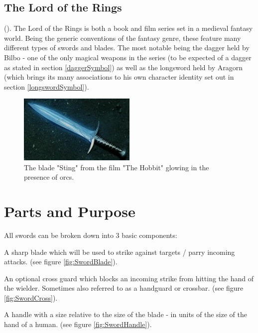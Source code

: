 \documentclass{article}
\begin{document}
\pagebreak

\subsection{The Lord of the Rings}

().
The Lord of the Rings is both a book and film series set in a medieval fantasy world. Being the generic conventions of the fantasy genre, these feature many different types of swords and blades. The most notable being the dagger held by Bilbo - one of the only magical weapons in the series (to be expected of a dagger as stated in section \ref{daggerSymbol}) as well as the longsword held by Aragorn (which brings its many associations to his own character identity set out in section \ref{longswordSymbol}).

\begin{figure}[h]
    \centering
    \caption{\parencite{Sting} The blade "Sting" from the film "The Hobbit" glowing in the presence of orcs.}
    \label{fig:Sting}
    \includegraphics[width=0.5\textwidth]{Sting.png}
\end{figure}

\pagebreak

\section{Parts and Purpose}
All swords can be broken down into 3 basic components:
\begin{list}{-}{}
    \item A sharp blade which will be used to strike against targets / parry incoming attacks. (see figure \ref{fig:SwordBlade}).
    \item An optional cross guard which blocks an incoming strike from hitting the hand of the wielder. Sometimes also referred to as a handguard or crossbar. (see figure \ref{fig:SwordCross}).
    \item A handle with a size relative to the size of the blade - in units of the size of the hand of a human. (see figure \ref{fig:SwordHandle}).
\end{list}
\end{document}
